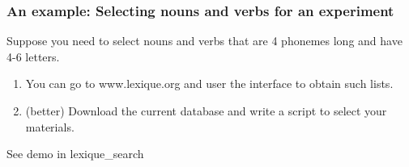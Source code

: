 \documentclass{beamer}
\begin{document}
\begin{frame}[fragile]
\frametitle{An example: Selecting nouns and verbs for an experiment}

Suppose you need to select nouns and verbs that are 4 phonemes long and have 4-6 letters.

\begin{enumerate}
\item You can go to www.lexique.org and user the interface to obtain such lists.

\item (better) Download the current database and write a script to select your materials.
\end{enumerate}

See demo in lexique\_search

\end{frame}
\end{document}
